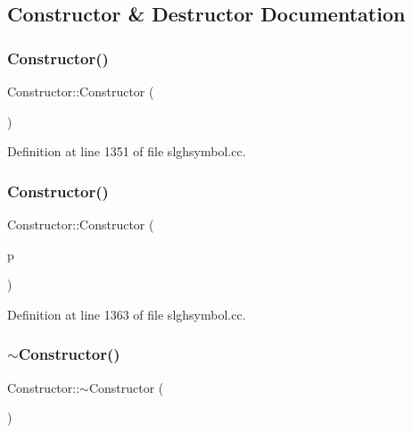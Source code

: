 \subsection{Constructor \& Destructor Documentation}
\mbox{\label{class_constructor_a4cd74cf3b3414093caa2af245108f0ed}} 
\subsubsection{\texorpdfstring{Constructor()}{Constructor()}\hspace{0.1cm}{\footnotesize\ttfamily [1/2]}}
{\footnotesize\ttfamily Constructor\+::\+Constructor (\begin{DoxyParamCaption}\item[{void}]{ }\end{DoxyParamCaption})}



Definition at line 1351 of file slghsymbol.\+cc.

\mbox{\label{class_constructor_a4379cb3ed1419d20e6c9d8fe2e023e7e}} 
\subsubsection{\texorpdfstring{Constructor()}{Constructor()}\hspace{0.1cm}{\footnotesize\ttfamily [2/2]}}
{\footnotesize\ttfamily Constructor\+::\+Constructor (\begin{DoxyParamCaption}\item[{\mbox{\hyperlink{class_subtable_symbol}{Subtable\+Symbol}} $\ast$}]{p }\end{DoxyParamCaption})}



Definition at line 1363 of file slghsymbol.\+cc.

\mbox{\label{class_constructor_a7893d15db6b1fb50b277b99b872919ec}} 
\subsubsection{\texorpdfstring{$\sim$Constructor()}{~Constructor()}}
{\footnotesize\ttfamily Constructor\+::$\sim$\+Constructor (\begin{DoxyParamCaption}\item[{void}]{ }\end{DoxyParamCaption})}



